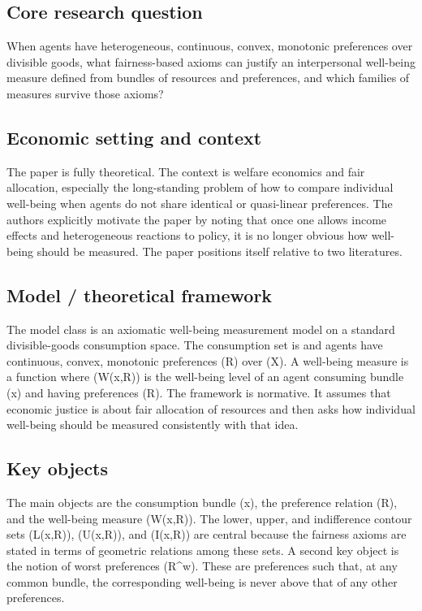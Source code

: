 \documentclass[11pt,a4paper]{article}
\begin{document}
\subsection*{Core research question}
When agents have heterogeneous, continuous, convex, monotonic preferences over divisible goods, what fairness-based axioms can justify an interpersonal well-being measure defined from bundles of resources and preferences, and which families of measures survive those axioms?

\subsection*{Economic setting and context}
The paper is fully theoretical. The context is welfare economics and fair allocation, especially the long-standing problem of how to compare individual well-being when agents do not share identical or quasi-linear preferences. The authors explicitly motivate the paper by noting that once one allows income effects and heterogeneous reactions to policy, it is no longer obvious how well-being should be measured. The paper positions itself relative to two literatures.

\subsection*{Model / theoretical framework}
The model class is an axiomatic well-being measurement model on a standard divisible-goods consumption space. The consumption set is and agents have continuous, convex, monotonic preferences (R) over (X). A well-being measure is a function where (W(x,R)) is the well-being level of an agent consuming bundle (x) and having preferences (R). The framework is normative. It assumes that economic justice is about fair allocation of resources and then asks how individual well-being should be measured consistently with that idea.

\subsection*{Key objects}
The main objects are the consumption bundle (x), the preference relation (R), and the well-being measure (W(x,R)). The lower, upper, and indifference contour sets (L(x,R)), (U(x,R)), and (I(x,R)) are central because the fairness axioms are stated in terms of geometric relations among these sets. A second key object is the notion of worst preferences (R\textasciicircum{}w). These are preferences such that, at any common bundle, the corresponding well-being is never above that of any other preferences.
\end{document}
